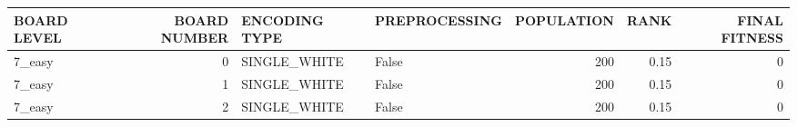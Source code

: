 \begin{tabular}{lrllrrr}
\hline
 BOARD LEVEL   &   BOARD NUMBER & ENCODING TYPE   & PREPROCESSING   &   POPULATION &   RANK &   FINAL FITNESS \\
\hline
 7\_easy        &              0 & SINGLE\_WHITE    & False           &          200 &   0.15 &               0 \\
 7\_easy        &              1 & SINGLE\_WHITE    & False           &          200 &   0.15 &               0 \\
 7\_easy        &              2 & SINGLE\_WHITE    & False           &          200 &   0.15 &               0 \\
\hline
\end{tabular}